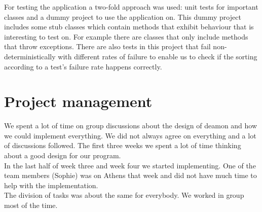 \documentclass[i2]{oss}
\begin{document}
For testing the application a two-fold approach was used: unit tests for
important classes and a dummy project to use the application on.
This dummy project includes some stub classes which contain methods that
exhibit behaviour that is interesting to test on.
For example there are classes that only include methods that throw 
exceptions.
There are also tests in this project that fail non-deterministically with 
different rates of failure to enable us to check if the sorting according 
to a test's failure rate happens correctly.



\section{Project management}
\label{ssec:Projectmanag}

We spent a lot of time on group discussions about the design of deamon and how we could implement everything. We did not always agree on everything and a lot of discussions followed. The first three weeks we spent a lot of time thinking about a good design for our program.\\ 

In the last half of week three and week four we started  implementing. One of the team members (Sophie) was on Athens that week and did not have much time to help with the implementation. \\

The division of tasks was about the same for everybody. We worked in group most of the time. 
\end{document}
